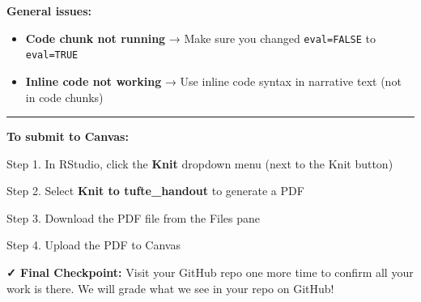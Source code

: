 \documentclass[]{tufte-handout}
\providecommand{\tightlist}{%
  \setlength{\itemsep}{0pt}\setlength{\parskip}{0pt}}
\begin{document}
\textbf{General issues:}

\begin{itemize}
\tightlist
\item
  \textbf{Code chunk not running} → Make sure you changed
  \texttt{eval=FALSE} to \texttt{eval=TRUE}
\item
  \textbf{Inline code not working} → Use inline code syntax in narrative
  text (not in code chunks)
\end{itemize}

\begin{center}\rule{0.5\linewidth}{0.5pt}\end{center}

\textbf{To submit to Canvas:}

Step 1. In RStudio, click the \textbf{Knit} dropdown menu (next to the
Knit button)

Step 2. Select \textbf{Knit to tufte\_handout} to generate a PDF

Step 3. Download the PDF file from the Files pane

Step 4. Upload the PDF to Canvas

\textbf{✓ Final Checkpoint:} Visit your GitHub repo one more time to
confirm all your work is there. We will grade what we see in your repo
on GitHub!
\end{document}
